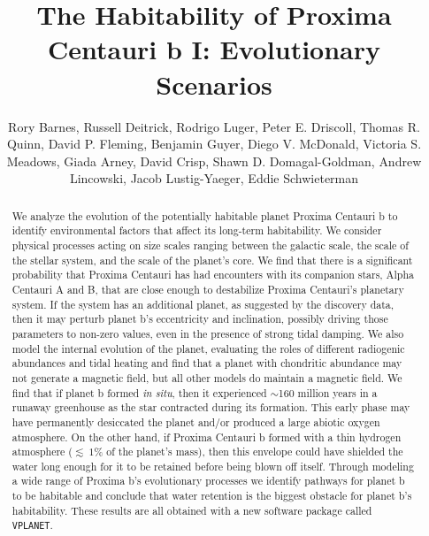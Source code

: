 \documentclass[preprint,12pt]{aastex}
\def\vplanet{\texttt{\footnotesize{VPLANET}}\xspace}
\begin{document}
\title{The Habitability of Proxima Centauri b I: Evolutionary Scenarios}
\author{Rory Barnes, Russell Deitrick, Rodrigo Luger, Peter E. Driscoll, Thomas R. Quinn, David P. Fleming, Benjamin Guyer, Diego V. McDonald, Victoria S. Meadows, Giada Arney, David Crisp, Shawn D. Domagal-Goldman, Andrew Lincowski, Jacob Lustig-Yaeger, Eddie Schwieterman}

\begin{abstract}
We analyze the evolution of the potentially habitable planet Proxima
Centauri b to identify environmental factors that affect its long-term
habitability. We consider physical processes acting on size scales 
ranging between the galactic scale, the scale of the stellar system, 
and the scale of the planet's core.
We find that there is a significant probability that
Proxima Centauri has had encounters with its companion stars, Alpha
Centauri A and B, that are close enough to destabilize Proxima
Centauri's planetary system. If the system has an additional
planet, as suggested by the discovery data, then it may perturb
planet b's eccentricity and inclination, possibly driving those
parameters to non-zero values, even in the presence of strong tidal
damping. We also model the internal evolution of the planet, evaluating
the roles of different radiogenic abundances and tidal heating and
find that a planet with chondritic abundance may not generate a magnetic field, but
all other models do maintain a magnetic field. We
find that if planet b formed {\it in situ}, then it
experienced $\sim$160 million years in a runaway greenhouse as the star
contracted during its formation. This early phase may have permanently
desiccated the planet and/or produced a large abiotic
oxygen atmosphere. On the other hand, if Proxima Centauri b formed
with a thin hydrogen atmosphere ($\lesssim~1$\% of the planet's mass), then this envelope could have shielded
the water long enough for it to be retained before being
blown off itself. Through modeling a wide range of Proxima b's evolutionary processes we identify pathways for planet b to be
habitable and conclude that water retention is the biggest obstacle
for planet b's habitability. These results are all obtained with a new
software package called \vplanet.

\end{abstract}
\end{document}
